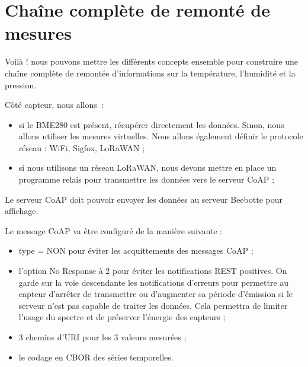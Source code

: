 
\section{Chaîne complète de remonté de mesures}

 \begin{figure}
\end{figure}


Voilà ! nous pouvons mettre les différents concepts ensemble pour construire une chaîne complète de remontée d'informations sur la température, l'humidité et la pression.

         \vspace{1em}

Côté capteur, nous allons~:

\begin{itemize}
    \item si le BME280 est présent, récupérer directement les données. Sinon, nous allons utiliser les mesures virtuelles. Nous allons également définir le protocole réseau : WiFi, Sigfox, LoRaWAN ;
    \item si nous utilisons un réseau LoRaWAN, nous devons mettre en place un programme relais pour transmettre les données vers le serveur CoAP ;
\end{itemize}

Le serveur CoAP doit pouvoir envoyer les données au serveur Beebotte pour affichage.

         \vspace{1em}

Le message CoAP va être configuré de la manière suivante :
\begin{itemize}
\item type = NON pour éviter les acquittements des messages CoAP ;
\item l'option No Response à 2 pour éviter les notifications REST positives. On garde sur la voie descendante les notifications d'erreurs pour permettre au capteur d'arrêter de transmettre ou d'augmenter sa période d'émission si le serveur n'est pas capable de traiter les données. Cela permettra de limiter l'usage du spectre et de préserver l'énergie des capteurs ;
\item 3 chemins d'URI pour les 3 valeurs mesurées ;
\item le codage en CBOR des séries temporelles.
\end{itemize}

